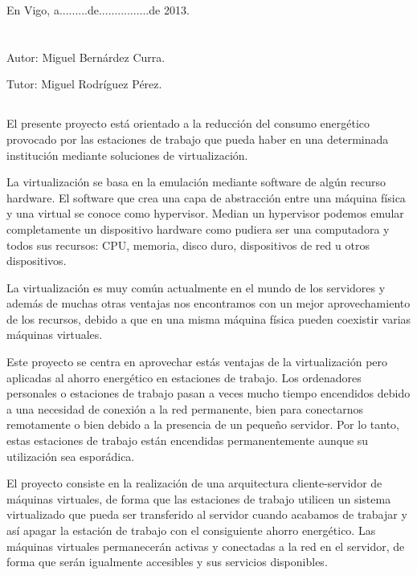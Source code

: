 \documentclass[spanisheDIVcalc,twoside,parskip-,pointlessnumbers,final]{scrbook}
\begin{document}
\centerline{En Vigo, a.........de................de 2013.}

\newpage{}
\thispagestyle{empty}
\mbox{}
\newpage{}
\section*{}

 \centerline{{Autor:} Miguel Bernárdez Curra.}
 \centerline{{Tutor:} Miguel Rodríguez Pérez.}
\subsection*{}
El presente proyecto está orientado a la reducción del consumo energético
provocado por las estaciones de trabajo que pueda haber en una determinada
institución mediante soluciones de virtualización.

La virtualización se basa en la emulación mediante software de algún
recurso hardware. El software que crea una capa de abstracción entre
una máquina física y una virtual se conoce como hypervisor. Median
un hypervisor podemos emular completamente un dispositivo hardware
como pudiera ser una computadora y todos sus recursos: CPU, memoria,
disco duro, dispositivos de red u otros dispositivos.

La virtualización es muy común actualmente en el mundo de los servidores
y además de muchas otras ventajas nos encontramos con un mejor aprovechamiento
de los recursos, debido a que en una misma máquina física pueden coexistir
varias máquinas virtuales.

Este proyecto se centra en aprovechar estás ventajas de la virtualización
pero aplicadas al ahorro energético en estaciones de trabajo. Los
ordenadores personales o estaciones de trabajo pasan a veces mucho
tiempo encendidos debido a una necesidad de conexión a la red permanente,
bien para conectarnos remotamente o bien debido a la presencia de
un pequeño servidor. Por lo tanto, estas estaciones de trabajo están
encendidas permanentemente aunque su utilización sea esporádica.

El proyecto consiste en la realización de una arquitectura cliente-servidor
de máquinas virtuales, de forma que las estaciones de trabajo utilicen
un sistema virtualizado que pueda ser transferido al servidor cuando
acabamos de trabajar y así apagar la estación de trabajo con el consiguiente
ahorro energético. Las máquinas virtuales permanecerán activas y conectadas
a la red en el servidor, de forma que serán igualmente accesibles
y sus servicios disponibles.
\end{document}
